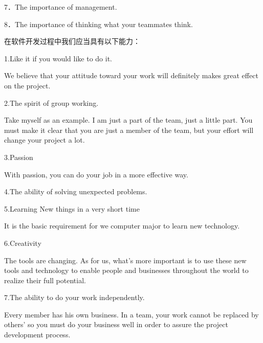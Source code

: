 7．The importance of management. 

8．The importance of thinking what your teammates think. 

在软件开发过程中我们应当具有以下能力： 

1.Like it if you would like to do it. 

We believe that your attitude toward your work will definitely makes great effect on the project. 

2.The spirit of group working. 

Take myself as an example. I am just a part of the team, just a little part. You must make it clear that you are just a member of the team, but your effort will change your project a lot. 

3.Passion 

With passion, you can do your job in a more effective way. 

4.The ability of solving unexpected problems. 

5.Learning New things in a very short time 

It is the basic requirement for we computer major to learn new technology. 

6.Creativity 

The tools are changing. As for us, what's more important is to use these new tools and technology to enable people and businesses throughout the world to realize their full potential. 

7.The ability to do your work independently. 

Every member has his own business. In a team, your work cannot be replaced by others' so you must do your business well in order to assure the project development process. 



\clearpage
